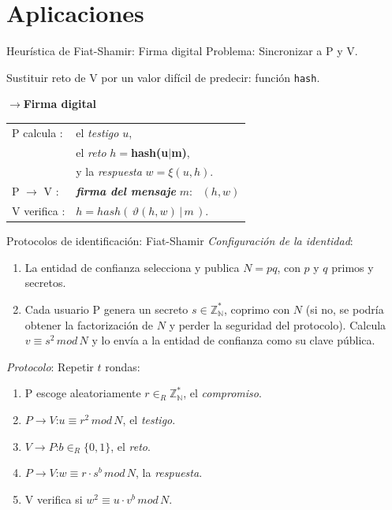\documentclass{beamer}
\begin{document}
\section{Aplicaciones}

\begin{frame}{Heurística de Fiat-Shamir: Firma digital}
	Problema: Sincronizar a P y V.
	
	Sustituir reto de V por un valor difícil de predecir: función \texttt{hash}.
	
	\textbf{$\rightarrow$Firma digital}
	
	\begin{center}
		\begin{tabular}{ll}
			P calcula :& el \textit{testigo} $u$,\\& el \textit{reto} $h=$\textbf{hash(u$\mid$m)},\\& y la \textit{respuesta} $w = \xi(u, h)$.
			\\
			P $\rightarrow$ V :& \textit{\textbf{firma del mensaje}} $m$: \, $(h,w)$
			\\
			V verifica :& $h=hash(\,\vartheta(h,w)\,|\,m\,)$.
		\end{tabular}
	\end{center}
\end{frame}





\begin{frame}{Protocolos de identificación: Fiat-Shamir}
	\textit{Configuración de la identidad}:
	\begin{enumerate}
		\item La entidad de confianza selecciona y publica $N=pq$, con $p$ y $q$ primos y secretos.
		
		\item Cada usuario P genera un secreto $s \in \mathbb{Z_N^*}$, coprimo con $N$ (si no, se podría obtener la factorización de $N$ y perder la seguridad del protocolo). Calcula $v \equiv s^2 \, mod \, N$ y lo envía a la entidad de confianza como su clave pública.
		
	\end{enumerate}
	
	
	\textit{Protocolo}: Repetir $t$ rondas:
	\begin{enumerate}
		\item P escoge aleatoriamente $r \in_R \mathbb{Z_N^*}$, el \textit{compromiso}.
		\item $P \rightarrow V$:\quad $u \equiv r^2 \, mod \, N$, el \textit{testigo}.
		\item $V \rightarrow P$:\quad $b \in_R \{0,1\}$, el \textit{reto}.
		\item $P \rightarrow V$:\quad $w \equiv r\cdot s^b \, mod \, N$, la \textit{respuesta}.
		\item V verifica si \quad $ w^2 \equiv u\cdot v^b \, mod \, N$.
	\end{enumerate}

\end{frame}
\end{document}
